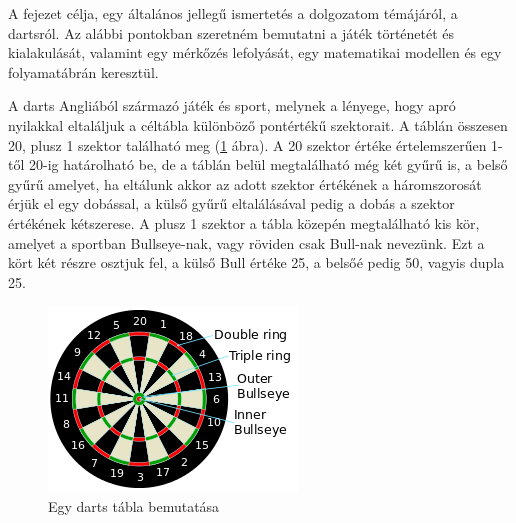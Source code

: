 
A fejezet célja, egy általános jellegű ismertetés a dolgozatom témájáról, a dartsról. Az alábbi pontokban szeretném bemutatni a játék történetét és kialakulását, valamint egy mérkőzés lefolyását, egy matematikai modellen és egy folyamatábrán keresztül.


A darts Angliából származó játék és sport, melynek a lényege, hogy apró nyilakkal eltaláljuk a céltábla különböző pontértékű szektorait. A táblán összesen 20, plusz 1 szektor található meg (\ref{fig:dartboard} ábra). A 20 szektor értéke értelemszerűen 1-től 20-ig határolható be, de a táblán belül megtalálható még két gyűrű is, a belső gyűrű amelyet, ha eltálunk akkor az adott szektor értékének a háromszorosát érjük el egy dobással, a külső gyűrű eltalálásával pedig a dobás a szektor értékének kétszerese. A plusz 1 szektor a tábla közepén megtalálható kis kör, amelyet a sportban Bullseye-nak, vagy röviden csak Bull-nak nevezünk. Ezt a kört két részre osztjuk fel, a külső Bull értéke 25, a belsőé pedig 50, vagyis dupla 25. \cite{Darts1}

\begin{figure}[h]
\centering
\includegraphics[scale=0.8]{images/Dartboard}
\caption{Egy darts tábla bemutatása}
\label{fig:dartboard}
\end{figure}
 
